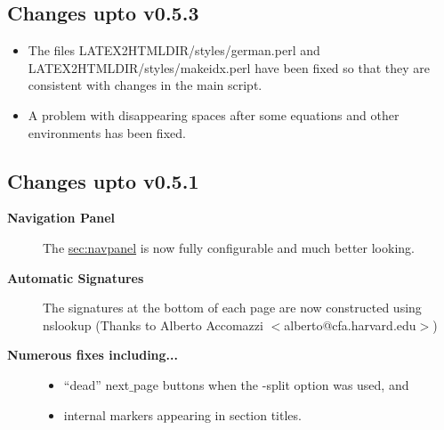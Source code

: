 \subsection{Changes upto v0.5.3}
\begin{itemize}
\item The files {\fn LATEX2HTMLDIR/styles/german.perl} and 
{\fn LATEX2HTMLDIR/styles/makeidx.perl} have been fixed
so that they are consistent with changes in the main script.
\item A problem with disappearing spaces after some equations
and other environments has been fixed.
\end{itemize}
\subsection{Changes upto v0.5.1}
\begin{description}
\item[{\bf Navigation Panel}]
The \hyperref{navigation panel}{navigation panel (see section
}{)}{sec:navpanel}
is now fully configurable and much better looking.
\item[{\bf Automatic Signatures}]
The signatures at the bottom of each page are now constructed
using {\fn nslookup} (Thanks to Alberto Accomazzi
$<$alberto@cfa.harvard.edu$>$)
\item[{\bf Numerous fixes including...}] \hfill
\begin{itemize}
\item ``dead'' {\fn next$\_$page} buttons when the {\fn -split} option
was used, and
\item internal \latextohtml markers appearing in section titles.
\end{itemize}
\end{description}

